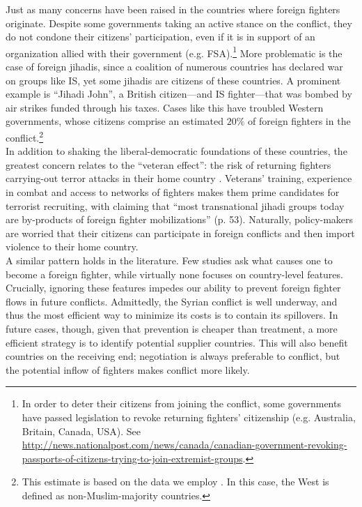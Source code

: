 \documentclass[12pt]{article}
\begin{document}
Just as many concerns have been raised in the countries where foreign fighters originate. Despite some governments taking an active stance on the conflict, they do not condone their citizens' participation, even if it is in support of an organization allied with their government (e.g. FSA).\footnote{In order to deter their citizens from joining the conflict, some governments have passed legislation to revoke returning fighters' citizenship (e.g. Australia, Britain, Canada, USA). See \href{http://news.nationalpost.com/news/canada/canadian-government-revoking-passports-of-citizens-trying-to-join-extremist-groups}{http://news.nationalpost.com/news/canada/canadian-government-revoking-passports-of-citizens-trying-to-join-extremist-groups}.} More problematic is the case of foreign jihadis, since a coalition of numerous countries has declared war on groups like IS, yet some jihadis are citizens of these countries. A prominent example is ``Jihadi John'', a British citizen---and IS fighter---that was bombed by air strikes funded through his taxes. Cases like this have troubled Western governments, whose citizens comprise an estimated $20\%$ of foreign fighters in the conflict.\footnote{This estimate is based on the data we employ \citep{Neumann2015}. In this case, the West is defined as non-Muslim-majority countries.} \\

In addition to shaking the liberal-democratic foundations of these countries, the greatest concern relates to the ``veteran effect'': the risk of returning fighters carrying-out terror attacks in their home country \citep{Hegghammer2013}. Veterans' training, experience in combat and access to networks of fighters makes them prime candidates for terrorist recruiting, with \cite{Hegghammer2011} claiming that ``most transnational jihadi groups today are by-products of foreign fighter mobilizations'' (p. 53). Naturally, policy-makers are worried that their citizens can participate in foreign conflicts and then import violence to their home country.	\\

A similar pattern holds in the literature. Few studies ask what causes one to become a foreign fighter, while virtually none focuses on country-level features. Crucially, ignoring these features impedes our ability to prevent foreign fighter flows in future conflicts. Admittedly, the Syrian conflict is well underway, and thus the most efficient way to minimize its costs is to contain its spillovers. In future cases, though, given that prevention is cheaper than treatment, a more efficient strategy is to identify potential supplier countries. This will also benefit countries on the receiving end; negotiation is always preferable to conflict, but the potential inflow of fighters makes conflict more likely.   \\
\end{document}
